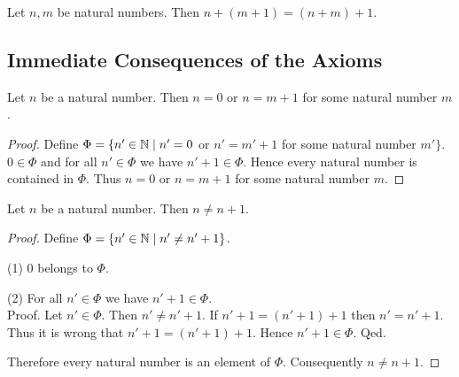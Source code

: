 \documentclass[10pt]{article}
\begin{document}
  \begin{forthel}
    \begin{axiom}
      Let $n, m$ be natural numbers.
      Then $n + (m + 1) = (n + m) + 1$.
    \end{axiom}
  \end{forthel}


  \subsection*{Immediate Consequences of the Axioms}

  \begin{forthel}
    \begin{proposition}
      Let $n$ be a natural number.
      Then $n = 0$ or $n = m + 1$ for some natural number $m$.
    \end{proposition}
    \begin{proof}
      Define $\Phi = \{ n' \in \mathbb{N} \mid n' = 0$ or $n' = m' + 1$ for some natural number $m' \}$.
      $0 \in \Phi$ and for all $n' \in  \Phi$ we have $n' + 1 \in \Phi$.
      Hence every natural number is contained in $\Phi$.
      Thus $n = 0$ or $n = m + 1$ for some natural number $m$.
    \end{proof}
  \end{forthel}

  \begin{forthel}
    \begin{proposition}
      Let $n$ be a natural number.
      Then $n \neq n + 1$.
    \end{proposition}
    \begin{proof}
      Define $\Phi = \{ n' \in \mathbb{N} \mid n' \neq n' + 1 \}$.

      (1) $0$ belongs to $\Phi$.

      (2) For all $n' \in \Phi$ we have $n' + 1 \in \Phi$. \\
      Proof.
        Let $n' \in \Phi$.
        Then $n' \neq n' + 1$.
        If $n' + 1 = (n' + 1) + 1$ then $n' = n' + 1$.
        Thus it is wrong that $n' + 1 = (n' + 1) + 1$.
        Hence $n' + 1 \in \Phi$.
      Qed.

      Therefore every natural number is an element of $\Phi$.
      Consequently $n \neq n + 1$.
    \end{proof}
  \end{forthel}
\end{document}
